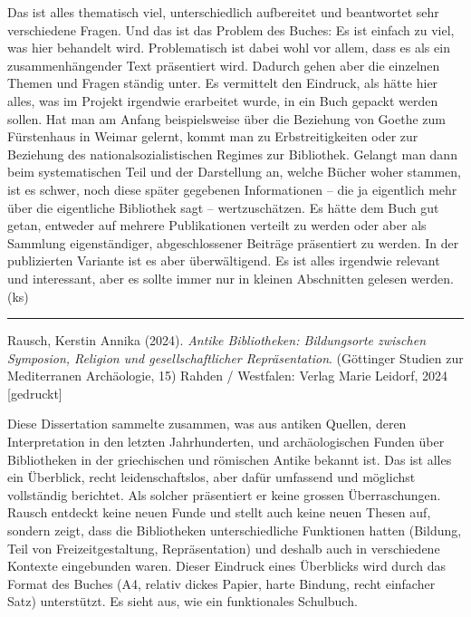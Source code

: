 \documentclass[a4paper,
fontsize=11pt,
oneside,
numbers=noperiodatend,
parskip=half-,
bibliography=totoc,
final
]{scrartcl}
\begin{document}
Das ist alles thematisch viel, unterschiedlich aufbereitet und
beantwortet sehr verschiedene Fragen. Und das ist das Problem des
Buches: Es ist einfach zu viel, was hier behandelt wird. Problematisch
ist dabei wohl vor allem, dass es als ein zusammenhängender Text
präsentiert wird. Dadurch gehen aber die einzelnen Themen und Fragen
ständig unter. Es vermittelt den Eindruck, als hätte hier alles, was im
Projekt irgendwie erarbeitet wurde, in ein Buch gepackt werden sollen.
Hat man am Anfang beispielsweise über die Beziehung von Goethe zum
Fürstenhaus in Weimar gelernt, kommt man zu Erbstreitigkeiten oder zur
Beziehung des nationalsozialistischen Regimes zur Bibliothek. Gelangt
man dann beim systematischen Teil und der Darstellung an, welche Bücher
woher stammen, ist es schwer, noch diese später gegebenen Informationen
-- die ja eigentlich mehr über die eigentliche Bibliothek sagt --
wertzuschätzen. Es hätte dem Buch gut getan, entweder auf mehrere
Publikationen verteilt zu werden oder aber als Sammlung eigenständiger,
abgeschlossener Beiträge präsentiert zu werden. In der publizierten
Variante ist es aber überwältigend. Es ist alles irgendwie relevant und
interessant, aber es sollte immer nur in kleinen Abschnitten gelesen
werden. (ks)

\begin{center}\rule{0.5\linewidth}{0.5pt}\end{center}

Rausch, Kerstin Annika (2024). \emph{Antike Bibliotheken: Bildungsorte
zwischen Symposion, Religion und gesellschaftlicher Repräsentation}.
(Göttinger Studien zur Mediterranen Archäologie, 15) Rahden / Westfalen:
Verlag Marie Leidorf, 2024 {[}gedruckt{]}

Diese Dissertation sammelte zusammen, was aus antiken Quellen, deren
Interpretation in den letzten Jahrhunderten, und archäologischen Funden
über Bibliotheken in der griechischen und römischen Antike bekannt ist.
Das ist alles ein Überblick, recht leidenschaftslos, aber dafür
umfassend und möglichst vollständig berichtet. Als solcher präsentiert
er keine grossen Überraschungen. Rausch entdeckt keine neuen Funde und
stellt auch keine neuen Thesen auf, sondern zeigt, dass die Bibliotheken
unterschiedliche Funktionen hatten (Bildung, Teil von
Freizeitgestaltung, Repräsentation) und deshalb auch in verschiedene
Kontexte eingebunden waren. Dieser Eindruck eines Überblicks wird durch
das Format des Buches (A4, relativ dickes Papier, harte Bindung, recht
einfacher Satz) unterstützt. Es sieht aus, wie ein funktionales
Schulbuch.
\end{document}
